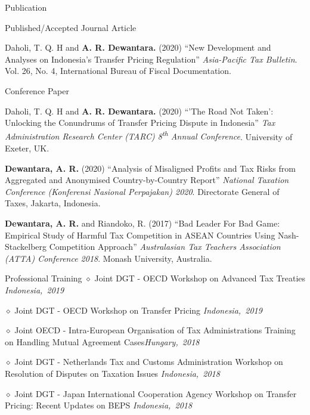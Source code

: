 \documentclass{resume}
\begin{document}
\begin{rSection}{Publication}
\begin{rSubsection}{Published/Accepted Journal Article}{}{}{}
 \item Daholi, T. Q. H and \textbf{A. R. Dewantara.} (2020) “New Development and Analyses on Indonesia’s Transfer Pricing Regulation” \textit{Asia-Pacific Tax Bulletin}. Vol. 26, No. 4, International Bureau of Fiscal Documentation.
\end{rSubsection}
\begin{rSubsection}{Conference Paper}{}{}{}
\item Daholi, T. Q. H and \textbf{A. R. Dewantara.} (2020) “’The Road Not Taken’: Unlocking the Conundrums of Transfer Pricing Dispute in Indonesia” \textit{Tax Administration Research Center (TARC) 8\textsuperscript{th} Annual Conference}. University of Exeter, UK.
\item \textbf{Dewantara, A. R.} (2020) “Analysis of Misaligned Profits and Tax Risks from Aggregated and Anonymised Country-by-Country Report” \textit{National Taxation Conference (Konferensi Nasional Perpajakan) 2020}. Directorate General of Taxes, Jakarta, Indonesia.
\item \textbf{Dewantara, A. R.} and Riandoko, R. (2017) “Bad Leader For Bad Game: Empirical Study of Harmful Tax Competition in ASEAN Countries Using Nash-Stackelberg Competition Approach” \textit{Australasian Tax Teachers Association (ATTA) Conference 2018}. Monash University, Australia.
\end{rSubsection}
\end{rSection}
\newpage
\begin{rSection}{Professional Training}
{$\diamond$ Joint DGT - OECD Workshop on Advanced Tax Treaties} \hfill\mbox{\em Indonesia, 2019} 

{$\diamond$ Joint DGT - OECD Workshop on Transfer Pricing} \hfill\mbox{\em Indonesia, 2019} 

{$\diamond$ Joint OECD - Intra-European Organisation of Tax Administrations Training\\ on Handling Mutual Agreement Cases}\hfill\mbox{\em Hungary, 2018}

{$\diamond$ Joint DGT - Netherlands Tax and Customs Administration Workshop on\\ Resolution of Disputes on Taxation Issues} \hfill\mbox{\em Indonesia, 2018}

{$\diamond$ Joint DGT - Japan International Cooperation Agency Workshop on Transfer\\ Pricing: Recent Updates on BEPS} \hfill\mbox{\em Indonesia, 2018}
\end{rSection}
\end{document}
